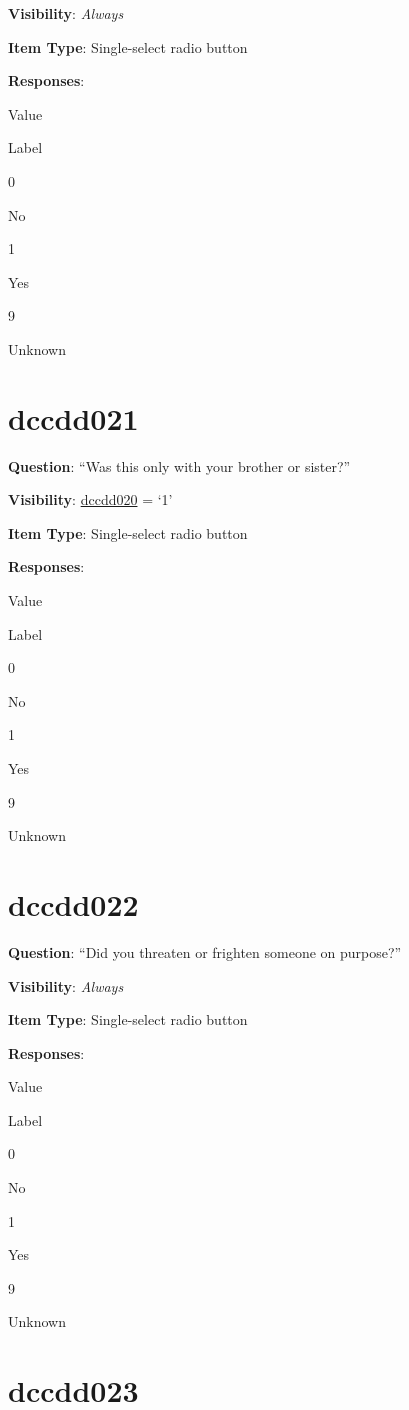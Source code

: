 \documentclass[]{book}
\begin{document}
\textbf{Visibility}: \emph{Always}

\textbf{Item Type}: Single-select radio button

\textbf{Responses}:

Value

Label

0

No

1

Yes

9

Unknown

\hypertarget{dccdd021}{%
\section{dccdd021}\label{dccdd021}}

\textbf{Question}: ``Was this only with your brother or sister?''

\textbf{Visibility}: \protect\hyperlink{dccdd020}{dccdd020} = `1'

\textbf{Item Type}: Single-select radio button

\textbf{Responses}:

Value

Label

0

No

1

Yes

9

Unknown

\hypertarget{dccdd022}{%
\section{dccdd022}\label{dccdd022}}

\textbf{Question}: ``Did you threaten or frighten someone on purpose?''

\textbf{Visibility}: \emph{Always}

\textbf{Item Type}: Single-select radio button

\textbf{Responses}:

Value

Label

0

No

1

Yes

9

Unknown

\hypertarget{dccdd023}{%
\section{dccdd023}\label{dccdd023}}
\end{document}
